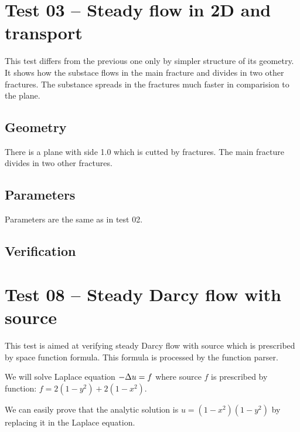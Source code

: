 
\section{Test 03 -- Steady flow in 2D and transport}
\label{sec:test03}
This test differs from the previous one only by simpler structure of its geometry. It shows how the substace flows in the main fracture and divides in two other fractures. The substance spreads in the fractures much faster in comparision to the plane.
\subsection*{Geometry}
There is a plane with side 1.0 which is cutted by fractures. The main fracture divides in two other fractures.
\subsection*{Parameters}
Parameters are the same as in test 02.
\subsection*{Verification}




\section{Test 08 -- Steady Darcy flow with source}
\label{sec:test08}
This test is aimed at verifying steady Darcy flow with source which is prescribed by space function formula. This formula is processed by the function parser.

We will solve Laplace equation $-\Delta{}u = f$ where source $f$ is prescribed by function: $f = 2(1-y^2) + 2(1-x^2)$.

We can easily prove that the analytic solution is $u = (1-x^2)(1-y^2)$ by replacing it in the Laplace equation.

